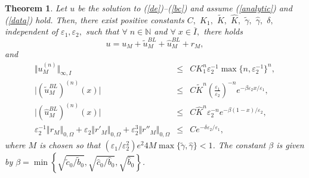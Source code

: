 \documentclass[12pt]{article}
\newtheorem{theorem}{Theorem}
\newcommand{\eps}{\varepsilon}
\begin{document}
\begin{theorem}\label{thm:main2}
Let $u$ be the solution to (\ref{de})--(\ref{bc}) and assume (\ref{analytic}) and (\ref{data}) hold. Then, there
exist positive constants $C,$ $K_1,$ $\tilde{K},$ $\hat{K},$  $\tilde{\gamma},$ $\hat{\gamma},$ $\delta ,$ independent of $\varepsilon_1, \varepsilon_2,$ such that $\forall \; n \in \mathbb{N}$ and $\forall \; x \in \overline{I},$ there holds
\begin{equation*}
u = u_M + \tilde{u}_M^{BL} + \hat{u}_M^{BL} + r_M,
\end{equation*}
and
\begin{eqnarray*}
\Vert u_M^{(n)} \Vert_{\infty, I} &\leq& C K_1^n \eps_2^{-1}\max \{ n, \eps^{-1}_2 \}^n  ,\\
 \vert (\tilde{u}^{BL}_{M})^{(n)}(x) \vert &\leq& C \tilde{K}^n \left( \frac{\varepsilon _{1}}{\varepsilon _{2}}\right) ^{-n}e^{-\beta \varepsilon
_{2}x/\varepsilon _{1}},\\
\vert (\hat{u}_{M}^{BL})^{(n)}(x) \vert &\leq& C \hat{K}^n \varepsilon
_{2}^{-n}e^{-\beta (1-x)/\varepsilon _{2}} , \\
\eps_2^{-1}\left\Vert r_M\right\Vert _{0,\Omega }+\varepsilon_2 \Vert r'_M \Vert_{0,\Omega} + \varepsilon_2^3 \Vert r''_M \Vert_{0,\Omega} &\leq& {C}  e^{-\delta \eps_2 /\eps_1},
\end{eqnarray*}%
where $M$ is chosen so that 
$(\varepsilon_1 / \varepsilon_2^2) e^2 4M \max \{ \tilde{\gamma}, \hat{\gamma}\} < 1$. The constant $\beta$ is given by $\beta = \min \left\{ \sqrt{\tilde{c}_{0} / \tilde{b}_{0}}, \sqrt{\hat{c}_{0} / \hat{b}_{0}},\sqrt{\hat{b}_{0}} \right\}$.
\end{theorem}
%
\end{document}

